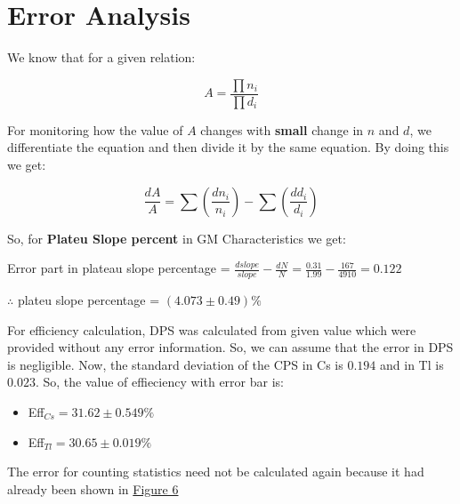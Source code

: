 \section{Error Analysis}
	We know that for a given relation:
	
	$$A = \frac{\prod n_i}{\prod d_i}$$
	
	For monitoring how the value of $A$ changes with \textbf{small} change in $n$ and $d$, we differentiate the equation and then divide it by the same equation. By doing this we get:
	
	$$\frac{dA}{A} = \sum\left(\frac{dn_i}{n_i}\right) - \sum\left(\frac{dd_i}{d_i}\right)$$

	So, for \textbf{Plateu Slope percent} in GM Characteristics we get:

	Error part in plateau slope percentage = $\frac{dslope}{slope} - \frac{dN}{N} = \frac{0.31}{1.99} - \frac{167}{4910} = 0.122$
	
	$\therefore$ plateu slope percentage = $(4.073 \pm 0.49)\%$

	For efficiency calculation, DPS was calculated from given value which were provided without any error information. So, we can assume that the error in DPS is negligible. Now, the standard deviation of the CPS in Cs is $0.194$ and in Tl is $0.023$. So, the value of effieciency with error bar is:

	\begin{itemize}
		\item Eff$_{Cs} = 31.62 \pm 0.549 \%$
		\item Eff$_{Tl} = 30.65 \pm 0.019 \%$
	\end{itemize}

	The error for counting statistics need not be calculated again because it had already been shown in \hyperref[graph:4]{Figure 6}
